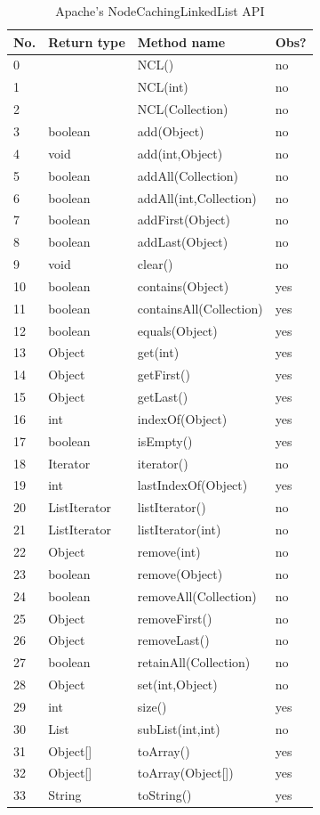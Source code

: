 \begin{table}[H]
\center
{\scriptsize
\begin{tabular}{|l|l|l|l|}
\hline
No. &Return type & Method name & Obs? \\
\hline
    0 && NCL() & no \\
    1& & NCL(int) & no \\
    2&& NCL(Collection) & no \\
    3&boolean & add(Object) & no \\
    4&void&add(int,Object) & no \\
    5&boolean&addAll(Collection) & no\\
    6&boolean&addAll(int,Collection) & no \\
    7&boolean&addFirst(Object) & no \\
    8&boolean&addLast(Object) & no\\
    9&void&clear() & no\\
    10&boolean&contains(Object) & yes \\
    11&boolean&containsAll(Collection) & yes \\
    12&boolean&equals(Object) & yes \\
    13&Object&get(int) & yes\\
    14&Object&getFirst() &yes \\
    15&Object&getLast() & yes\\
    16&int&indexOf(Object) &yes\\
    17&boolean&isEmpty() & yes\\
    18&Iterator&iterator() & no\\
    19&int&lastIndexOf(Object) &yes \\
    20&ListIterator&listIterator() &no \\
    21&ListIterator&listIterator(int) & no\\
    22&Object&remove(int) &no\\
    23&boolean&remove(Object) & no \\
    24&boolean&removeAll(Collection) & no \\
    25&Object&removeFirst() &no\\
    26&Object&removeLast() &no\\
    27&boolean&retainAll(Collection) &no \\
    28&Object&set(int,Object) &no\\
    29&int&size() &yes\\
    30&List&subList(int,int) & no \\
    31&Object[]&toArray() & yes \\
    32&Object[]&toArray(Object[]) &yes\\
    33&String&toString() & yes \\
\hline
\end{tabular}
}
\caption{Apache's NodeCachingLinkedList API}
\label{tab:ncl-api}
\end{table} 


